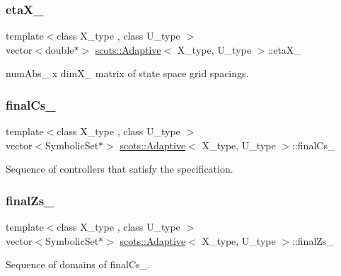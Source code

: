 \subsubsection{\texorpdfstring{eta\+X\+\_\+}{etaX\_}}
{\footnotesize\ttfamily template$<$class X\+\_\+type , class U\+\_\+type $>$ \\
vector$<$double$\ast$$>$ \hyperlink{classscots_1_1Adaptive}{scots\+::\+Adaptive}$<$ X\+\_\+type, U\+\_\+type $>$\+::eta\+X\+\_\+}

num\+Abs\+\_\+ x dim\+X\+\_\+ matrix of state space grid spacings. \mbox{\label{classscots_1_1Adaptive_a5a70ee2d2b4efe4f5eb20d08a596ec7b}} 
\subsubsection{\texorpdfstring{final\+Cs\+\_\+}{finalCs\_}}
{\footnotesize\ttfamily template$<$class X\+\_\+type , class U\+\_\+type $>$ \\
vector$<$Symbolic\+Set$\ast$$>$ \hyperlink{classscots_1_1Adaptive}{scots\+::\+Adaptive}$<$ X\+\_\+type, U\+\_\+type $>$\+::final\+Cs\+\_\+}

Sequence of controllers that satisfy the specification. \mbox{\label{classscots_1_1Adaptive_af22209ae22c8b2dd921be22cc51a36dd}} 
\subsubsection{\texorpdfstring{final\+Zs\+\_\+}{finalZs\_}}
{\footnotesize\ttfamily template$<$class X\+\_\+type , class U\+\_\+type $>$ \\
vector$<$Symbolic\+Set$\ast$$>$ \hyperlink{classscots_1_1Adaptive}{scots\+::\+Adaptive}$<$ X\+\_\+type, U\+\_\+type $>$\+::final\+Zs\+\_\+}

Sequence of domains of final\+Cs\+\_\+. \mbox{\label{classscots_1_1Adaptive_a4184aca345cd09023c656bc616c2ee9a}} 
